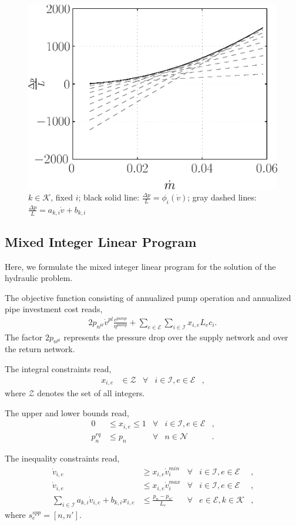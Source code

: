 \documentclass[a4paper,10pt]{article}
\begin{document}
\begin{figure}
  \centering
  \includegraphics[width=.6\textwidth]{Fig/cuts}
  \caption{$k\in\mathcal{K}$, fixed $i$; black solid line: $\frac{\Delta p}{L}=\phi_i(\dot{v})$; gray dashed lines: $\frac{\Delta p}{L}=a_{k,i}\dot{v}+b_{k,i}$}\label{fig:1}
\end{figure}

\subsection{Mixed Integer Linear Program}

Here, we formulate the mixed integer linear program for the solution of the hydraulic problem.

The objective function consisting of annualized pump operation and annualized pipe investment cost reads,
\begin{align}
2 p_{n^{pl}} \dot{v}^{pl}\frac{c^{pump}}{\eta^{pump}} + \sum_{e\in\mathcal{E}}\sum_{i\in\mathcal{I}} x_{i,e} L_e c_i.
\end{align}
The factor $2 p_{n^{pl}}$ represents the pressure drop over the supply network and over the return network.

The integral constraints read,
\begin{align}
 x_{i,e} &\in \mathcal{Z} &\forall& i\in\mathcal{I},e\in\mathcal{E}&,
\end{align}
where $\mathcal{Z}$ denotes the set of all integers.

The upper and lower bounds read,
\begin{align}
 0&\le x_{i,e}\le1  &\forall& i\in\mathcal{I},e\in\mathcal{E} &,\\
 p_n^{rq}&\le p_{n} &\forall& n\in\mathcal{N}   &.
\end{align}

The inequality constraints read,
\begin{align}
 \dot{v}_{i,e}&\ge x_{i,e}\dot{v}_i^{min}&\forall& i\in\mathcal{I},e\in\mathcal{E} &,\\
 \dot{v}_{i,e}&\le x_{i,e}\dot{v}_i^{max}&\forall& i\in\mathcal{I},e\in\mathcal{E} &,\\
 \sum_{i\in\mathcal{I}} a_{k,i}\dot{v}_{i,e} +b_{k,i}x_{i,e} &\le \frac{p_{n}-p_{n'}}{L_e}&\forall& e\in\mathcal{E},k\in\mathcal{K}&,
\end{align}
where $s_e^{spp}=[n,n']$.
\end{document}
